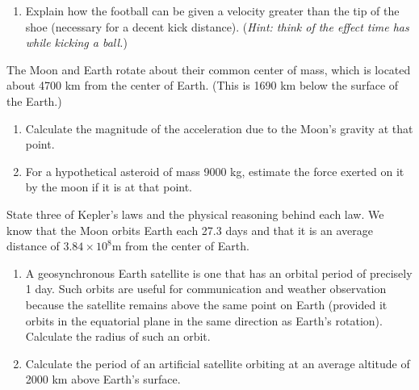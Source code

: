\documentclass[12pt,addpoints]{exam}
\begin{document}
\begin{questions}
\begin{enumerate}[label=(\roman*)]
			\item Explain how the football can be given a velocity greater than the tip of the shoe (necessary for a decent kick
			distance). (\textit{Hint: think of the effect time has while kicking a ball.})\vspace{1.5in}
		\end{enumerate}	
		\question The Moon and Earth rotate about their common center of mass, which is located about 4700 km from the center of Earth.
		(This is 1690 km below the surface of the Earth.)
		\begin{enumerate}[label=(\roman*)]
			\item Calculate the magnitude of the acceleration due to the Moon’s gravity at that point.\vspace{1.5in}
			\item For a hypothetical asteroid of mass 9000 kg, estimate the force exerted on it by  the moon if it is at that point.\vspace{1.5in}
		\end{enumerate}
		\question State three of Kepler's laws and the physical reasoning behind each law.\vspace{2.5in}
		\question We know that the Moon orbits Earth each 27.3 days and that it is an average distance of $3.84\times10^{8}$m from the center of Earth. 
		\begin{enumerate}[label=(\roman*)]
			\item A geosynchronous Earth satellite is one that has an orbital period of precisely 1 day. Such orbits are useful for
			communication and weather observation because the satellite remains above the same point on Earth (provided it orbits in the
			equatorial plane in the same direction as Earth’s rotation). Calculate the radius of such an orbit.\vspace{1.5in}
			\item Calculate the period of an artificial satellite orbiting at an average altitude of 2000 km above Earth’s surface.\vspace{1.5in}
		\end{enumerate}\newpage

\end{questions}
\end{document}
